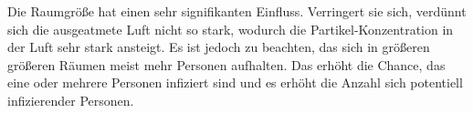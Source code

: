 \documentclass[12pt,a4paper,bibtotocnumbered,liststotocnumbered]{scrreprt}
\begin{document}
Die Raumgröße hat einen sehr signifikanten Einfluss. Verringert sie sich, verdünnt sich die ausgeatmete Luft nicht so stark, wodurch die Partikel-Konzentration in der Luft sehr stark ansteigt. Es ist jedoch zu beachten, das sich in größeren größeren Räumen meist mehr Personen aufhalten. Das erhöht die Chance, das eine oder mehrere Personen infiziert sind und es erhöht die Anzahl sich potentiell infizierender Personen.



\newpage
\RaggedRight



\listoffigures

\listoftables
\end{document}
